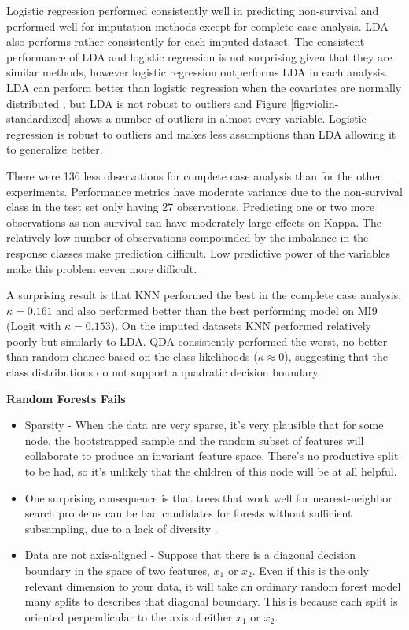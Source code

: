 \documentclass[12pt,]{article}
\begin{document}
Logistic regression performed consistently well in predicting
non-survival and performed well for imputation methods except for
complete case analysis. LDA also performs rather consistently for each
imputed dataset. The consistent performance of LDA and logistic
regression is not surprising given that they are similar methods,
however logistic regression outperforms LDA in each analysis. LDA can
perform better than logistic regression when the covariates are normally
distributed \citep{efron_efficiency_1975}, but LDA is not robust to
outliers \citep{hastie_elements_2009} and Figure
\ref{fig:violin-standardized} shows a number of outliers in almost every
variable. Logistic regression is robust to outliers and makes less
assumptions than LDA \citep{hastie_elements_2009} allowing it to
generalize better.

There were 136 less observations for complete case analysis than for the
other experiments. Performance metrics have moderate variance due to the
non-survival class in the test set only having 27 observations.
Predicting one or two more observations as non-survival can have
moderately large effects on Kappa. The relatively low number of
observations compounded by the imbalance in the response classes make
prediction difficult. Low predictive power of the variables make this
problem eeven more difficult.

A surprising result is that KNN performed the best in the complete case
analysis, \(\kappa=0.161\) and also performed better than the best
performing model on MI9 (Logit with \(\kappa=0.153\)). On the imputed
datasets KNN performed relatively poorly but similarly to LDA. QDA
consistently performed the worst, no better than random chance based on
the class likelihoods (\(\kappa \approx 0\)), suggesting that the class
distributions do not support a quadratic decision boundary.

\textbf{Random Forests Fails}

\begin{itemize}
\item
  Sparsity - When the data are very sparse, it's very plausible that for
  some node, the bootstrapped sample and the random subset of features
  will collaborate to produce an invariant feature space. There's no
  productive split to be had, so it's unlikely that the children of this
  node will be at all helpful.
\item
  One surprising consequence is that trees that work well for
  nearest-neighbor search problems can be bad candidates for forests
  without sufficient subsampling, due to a lack of diversity
  \citep{tang_when_2018}.
\item
  Data are not axis-aligned - Suppose that there is a diagonal decision
  boundary in the space of two features, \(x_1\) or \(x_2\). Even if
  this is the only relevant dimension to your data, it will take an
  ordinary random forest model many splits to describes that diagonal
  boundary. This is because each split is oriented perpendicular to the
  axis of either \(x_1\) or \(x_2\).
\end{itemize}
\end{document}
